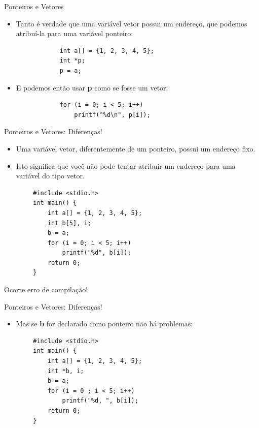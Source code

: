 \documentclass[handout]{beamer}
\begin{document}
\begin{frame}[fragile]{Ponteiros e Vetores}

    \begin{itemize}
        \item Tanto é verdade que uma variável vetor possui um endereço, que podemos
        atribuí-la para uma variável ponteiro:
        \begin{verbatim}
            int a[] = {1, 2, 3, 4, 5};
            int *p;
            p = a;
        \end{verbatim}

        \item E podemos então usar {\bf p} como se fosse um vetor:
        \begin{verbatim}
            for (i = 0; i < 5; i++)
                printf("%d\n", p[i]);
        \end{verbatim}
    \end{itemize}

\end{frame}

\begin{frame}[fragile]{Ponteiros e Vetores: Diferenças!}

    \begin{itemize}
        \item Uma variável vetor, diferentemente de um ponteiro, possui um
        endereço fixo.
        \item Isto significa que você não pode tentar atribuir um endereço para
        uma variável do tipo vetor.
    \end{itemize}
    \vspace{-1em}
    \begin{verbatim}
        #include <stdio.h>
        int main() {
            int a[] = {1, 2, 3, 4, 5};
            int b[5], i;
            b = a;
            for (i = 0; i < 5; i++)
                printf("%d", b[i]);
            return 0;
        }
    \end{verbatim}

    Ocorre erro de compilação!
\end{frame}

\begin{frame}[fragile]{Ponteiros e Vetores: Diferenças!}

    \begin{itemize}
        \item Mas se {\bf b} for declarado como ponteiro não há problemas:
    \end{itemize}
    \vspace{-1em}
    \begin{verbatim}
        #include <stdio.h>
        int main() {
            int a[] = {1, 2, 3, 4, 5};
            int *b, i;
            b = a;
            for (i = 0 ; i < 5; i++)
                printf("%d, ", b[i]);
            return 0;
        }
    \end{verbatim}

\end{frame}
\end{document}
